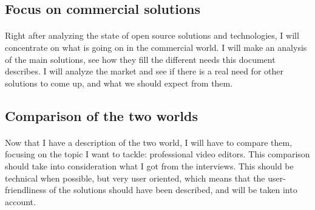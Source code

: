     \subsection*{Focus on commercial solutions}
       \paragraph{}
            Right after analyzing the state of open source solutions and
            technologies, I will concentrate on what is going on in the commercial
            world. I will make an analysis of the main solutions, see how they
            fill the different needs this document describes. I will analyze the
            market and see if there is a real need for other solutions to come
            up, and what we should expect from them.

    \subsection*{Comparison of the two worlds}
        \paragraph {}
            Now that I have a description of the two world, I will have to compare
            them, focusing on the topic I want to tackle: professional video
            editors. This comparison should take into consideration what I got from
            the interviews. This should be technical when possible, but very user
            oriented, which means that the user-friendliness of the solutions should have
            been described, and will be taken into account.


